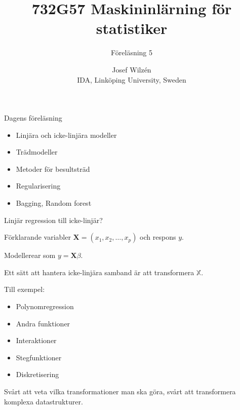 \documentclass[10pt,english]{beamer}
\title{732G57 Maskininlärning för statistiker}
\subtitle{Föreläsning 5}
\date{}
\author{Josef Wilzén \\ IDA, Linköping University, Sweden}
\begin{document}
\maketitle

\begin{frame}{Dagens föreläsning}
    
    \begin{itemize}
        \item Linjära och icke-linjära modeller
        \item Trädmodeller
        \item Metoder för besultsträd
        \item Regularisering
        \item Bagging, Random forest
    \end{itemize}

\end{frame}


\begin{frame}{Linjär regression till icke-linjär?}
    
    Förklarande variabler $\mathbf{X} = (x_1, x_2, \ldots, x_p)$ och respons $y$.

    Modellerear som $y = \mathbf{X}\beta$.

    Ett sätt att hantera icke-linjära samband är att transformera $\mathbb{X}$.

    Till exempel:
    \begin{itemize}
        \item Polynomregression
        \item Andra funktioner
        \item Interaktioner
        \item Stegfunktioner
        \item Diskretisering
    \end{itemize}

    Svårt att veta vilka transformationer man ska göra, svårt att transformera komplexa datastrukturer.

\end{frame}
\end{document}
